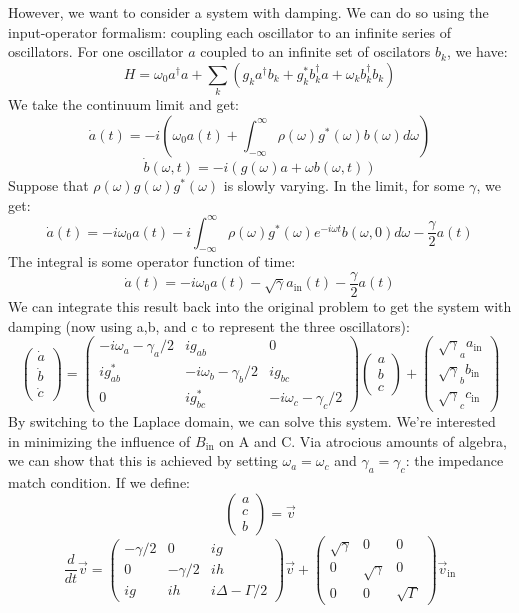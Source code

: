 \documentclass[final]{article}
\begin{document}
However, we want to consider a system with damping. We can do so using the input-operator formalism: coupling each oscillator to an infinite series of oscillators. For one oscillator \(a\) coupled to an infinite set of oscilators \(b_k\), we have:
\[H=\omega_0 a^\dagger a+\sum_k (g_k a^\dagger b_k+g_k^* b_k^\dagger a+\omega_k b_k^\dagger b_k)\]
We take the continuum limit and get:
\[\dot a(t)=-i\left(\omega_0 a(t)+\int_{-\infty}^\infty \rho(\omega) g^*(\omega) b(\omega) d\omega\right)\]
\[\dot b(\omega,t)=-i(g(\omega) a+\omega b(\omega,t))\]
Suppose that \(\rho(\omega)g(\omega)g^*(\omega)\) is slowly varying. In the limit, for some \(\gamma\), we get:
\[\dot a(t)=-i\omega_0 a(t)-i\int_{-\infty}^\infty \rho(\omega) g^*(\omega) 
e^{-i\omega t}b(\omega,0)d\omega- \frac{\gamma}{2} a(t)\]
The integral is some operator function of time:
\[\dot a(t)=-i\omega_0 a(t)-\sqrt{\gamma}a_{\text{in}}(t)- \frac{\gamma}{2} a(t)\]
We can integrate this result back into the original problem to get the system with damping (now using a,b, and c to represent the three oscillators):
\[\begin{pmatrix}\dot a\\\dot b\\\dot c\end{pmatrix}=\begin{pmatrix}-i\omega_a-\gamma_a/2 &ig_{ab} & 0\\ig^*_{ab}&-i\omega_b-\gamma_b/2 & ig_{bc}\\
0& ig^*_{bc}&-i\omega_c-\gamma_c/2\end{pmatrix}\begin{pmatrix}a\\b\\c\end{pmatrix}+
\begin{pmatrix} \sqrt{\gamma}_a a_{\text{in}}\\\sqrt{\gamma}_b b_{\text{in}}\\\sqrt{\gamma}_c c_{\text{in}}\end{pmatrix}\]
By switching to the Laplace domain, we can solve this system. We're interested in minimizing the influence of \(B_{\text{in}}\) on A and C. Via atrocious amounts of algebra, we can show that this is achieved by setting \(\omega_a=\omega_c\) and \(\gamma_a=\gamma_c\): the impedance match condition. If we define:
\[\begin{pmatrix}a\\c\\b\end{pmatrix}=\vec v\]
\[\frac{d}{dt} \vec v=\begin{pmatrix} -\gamma/2 & 0 & ig\\0 & -\gamma/2 & ih\\ig& ih & i\Delta-\Gamma/2\end{pmatrix}\vec v+
\begin{pmatrix} \sqrt{\gamma}&0&0\\0&\sqrt{\gamma}&0\\0&0&\sqrt{\Gamma}\end{pmatrix}\vec v_{\text{in}}\]
\end{document}
